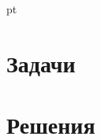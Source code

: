 \documentclass[12pt,a4paper]{article}
\begin{document}
 pt

\section{Задачи}
\problemonly



\restoresection
\section{Решения}
\solutiononly

\addtocounter{secsolution}{1} %


\end{document}

